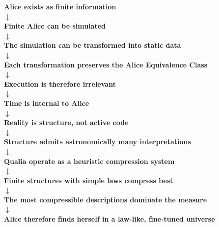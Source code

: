 \begin{center}
    \sffamily
    \textbf{Alice exists as finite information} \\
    $\downarrow$ \\
    \textbf{Finite Alice can be simulated} \\
    $\downarrow$ \\
    \textbf{The simulation can be transformed into static data} \\
    $\downarrow$ \\
    \textbf{Each transformation preserves the Alice Equivalence Class} \\
    $\downarrow$ \\
    \textbf{Execution is therefore irrelevant} \\
    $\downarrow$ \\
    \textbf{Time is internal to Alice} \\
    $\downarrow$ \\
    \textbf{Reality is structure, not active code} \\
    $\downarrow$ \\
    \textbf{Structure admits astronomically many interpretations} \\
    $\downarrow$ \\
    \textbf{Qualia operate as a heuristic compression system} \\
    $\downarrow$ \\
    \textbf{Finite structures with simple laws compress best} \\
    $\downarrow$ \\
    \textbf{The most compressible descriptions dominate the measure} \\
    $\downarrow$ \\
    \textbf{Alice therefore finds herself in a law-like, fine-tuned universe}
\end{center}

